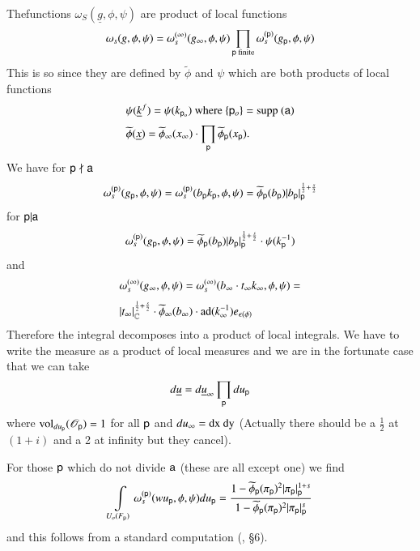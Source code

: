 The\pageoriginale functions $\omega_{S}(\underline{g},\phi,\psi)$ are product of local functions
$$
\omega_{s}(g,\phi,\psi)=\omega^{(\infty)}_{s}(g_{\infty},\phi,\psi)\prod\limits_{\mathsf{p}\text{~finite}}\omega_{s}^{(\mathsf{p})}(g_{\mathsf{p}},\phi,\psi)
$$
This is so since they are defined by $\widetilde{\phi}$ and $\psi$ which are both products of local functions
\begin{align*}
& \psi(\underline{k}^{f})=\psi(k_{\mathsf{p}_{o}})\text{~~ where~~ }\{\mathsf{p}_{o}\}=\text{supp~}(\mathsf{a})\\[3pt]
& \widetilde{\phi}(\underline{x})=\widetilde{\phi}_{\infty}(x_{\infty})\cdot \prod\limits_{\mathsf{p}}\widetilde{\phi}_{\mathsf{p}}(x_{\mathsf{p}}).
\end{align*}
We have for $\mathsf{p}\nmid \mathsf{a}$
$$
\omega^{(\mathsf{p})}_{s}(g_{\mathsf{p}},\phi,\psi)=\omega_{s}^{(\mathsf{p})}(b_{\mathsf{p}}k_{\mathsf{p}},\phi,\psi)=\widetilde{\phi}_{\mathsf{p}}(b_{\mathsf{p}})|b_{\mathsf{p}}|_{\mathsf{p}}^{\frac{1}{2}+\frac{s}{2}}
$$
for $\mathsf{p}|\mathsf{a}$
$$
\omega_{s}^{(\mathsf{p})}(g_{\mathsf{p}},\phi,\psi)=\widetilde{\phi}_{\mathsf{p}}(b_{\mathsf{p}})|b_{\mathsf{p}}|_{\mathsf{p}}^{\frac{1}{2}+\frac{s}{2}}\cdot \psi(k^{-1}_{\mathsf{p}})
$$
and
\begin{align*}
& \omega_{s}^{(\infty)}(g_{\infty},\phi,\psi)=\omega_{s}^{(\infty)}(b_{\infty}\cdot t_{\infty}k_{\infty},\phi,\psi)=\\[3pt]
& |t_{\infty}|^{\frac{1}{2}+\frac{s}{2}}_{\mathbb{C}}\cdot \widetilde{\phi}_{\infty}(b_{\infty})\cdot \operatorname{ad}(k^{-1}_{\infty})e_{\epsilon(\phi)}
\end{align*}
Therefore the integral decomposes into a product of local integrals. We have to write the measure as a product of local measures and we are in the fortunate case that we can take
$$
d\underline{u}=d\underline{u}_{\infty}\prod\limits_{\mathsf{p}}du_{\mathsf{p}}
$$
where $\operatorname{vol}_{du_{\mathsf{p}}}(\mathscr{O}_{\mathsf{p}})=1$ for all $\mathsf{p}$ and $du_{\infty}=\mathrm{dx} \ \mathrm{dy}$ (Actually there should be a $\frac{1}{2}$ at $(1+i)$ and a 2 at infinity but they cancel).

For those $\mathsf{p}$ which do not divide $\mathsf{a}$ (these are all except one) we find
$$
\int\limits_{U_{o}(F_{\mathsf{p}})}\omega^{(\mathsf{p})}_{s}(wu_{\mathsf{p}},\phi,\psi)du_{\mathsf{p}}=\frac{1-\widetilde{\phi}_{\mathsf{p}}(\pi_{\mathsf{p}})^{2}|\pi_{\mathsf{p}}|^{1+s}_{\mathsf{p}}}{1-\widetilde{\phi}_{\mathsf{p}}(\pi_{\mathsf{p}})^{2}|\pi_{\mathsf{p}}|^{s}_{\mathsf{p}}}
$$
and this follows from a standard computation (\cite{art2-key11}, \S6).

